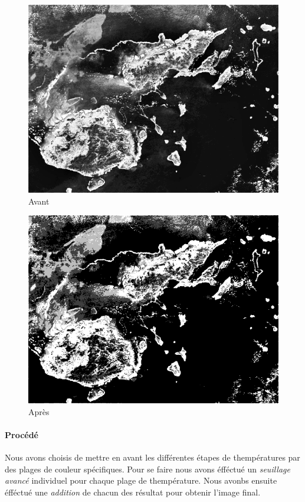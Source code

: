 	\begin{figure}[h]
	\centering
		\begin{multicols}{2}
		\includegraphics[scale=0.55]{images/HD215497.png}
		Avant

		\includegraphics[scale=0.55]{images/MissionB3.png}
		Après
		\end{multicols}
	\end{figure}
	\vspace{-0.9cm}

	\paragraph{Procédé}	
		Nous avons choisis de mettre en avant les différentes étapes de thempératures par des plages de couleur spécifiques. Pour se faire nous avons éfféctué un \emph{seuillage avancé} individuel pour chaque plage de thempérature. Nous avonbs ensuite éfféctué une \emph{addition} de chacun des résultat pour obtenir l'image final. 